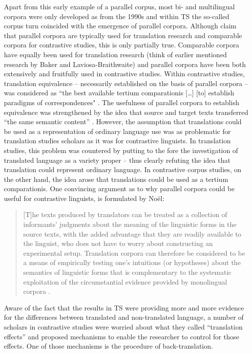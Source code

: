 Apart from this early example of a parallel corpus, most bi- and multilingual corpora were only developed as from the 1990s \citep[19]{mcenery_corpus_2012} and within TS the so-called corpus turn coincided with the emergence of parallel corpora. Although \citet[20]{mcenery_corpus_2012} claim that parallel corpora are typically used for translation research and comparable corpora for contrastive studies, this is only partially true. Comparable corpora have equally been used for translation research (think of earlier mentioned research by Baker and Laviosa-Braithwaite) and parallel corpora have been both extensively and fruitfully used in contrastive studies. Within contrastive studies, translation equivalence – necessarily established on the basis of parallel corpora – was considered as “the best available tertium comparationis […] [to] establish paradigms of correspondences" \citep[5]{johansson_role_1998}. The usefulness of parallel corpora to establish equivalence was strengthened by the idea that source and target texts transferred “the same semantic content” \citep[19]{granger_corpus_2003}. However, the assumption that translations could be used as a representation of ordinary language use was as problematic for translation studies scholars as it was for contrastive linguists. In translation studies, this problem was countered by putting to the fore the investigation of translated language as a variety proper – thus clearly refuting the idea that translation could represent ordinary language. In contrastive corpus studies, on the other hand, the idea arose that translations could be used as a tertium comparationis. One convincing argument as to why parallel corpora could be useful for contrastive linguists, is formulated by Noël:\largerpage

\begin{quote}
[T]he texts produced by translators can be treated as a collection of informants’ judgments about the meaning of the linguistic forms in the source texts, with the added advantage that they are readily available to the linguist, who does not have to worry about constructing an experimental setup. Translation corpora can therefore be considered to be a means of empirically testing one’s intuitions (or hypotheses) about the semantics of linguistic forms that is complementary to the systematic exploitation of the circumstantial evidence provided by monolingual corpora \citep[759]{noel_translations_2003}.
\end{quote}

Aware of the fact that the results in TS were providing more and more evidence for the differences between translated and non-translated language, a number of scholars in contrastive studies were worried about what they called “translation effects” \citep[6]{johansson_role_1998} and proposed mechanisms to enable the researcher to control for those effects. One of those mechanisms is the procedure of back-translation.


